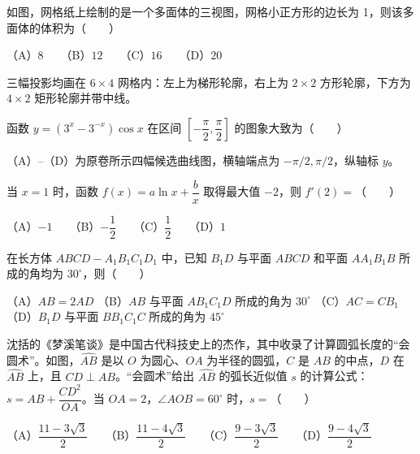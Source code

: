 \begin{question}
如图，网格纸上绘制的是一个多面体的三视图，网格小正方形的边长为 1，则该多面体的体积为\mbox{（　　）}

（A）$8$　　（B）$12$　　（C）$16$　　（D）$20$

三幅投影均画在 $6\times4$ 网格内：左上为梯形轮廓，右上为 $2\times2$ 方形轮廓，下方为 $4\times2$ 矩形轮廓并带中线。
\nopagebreak[4]
\begin{center}\end{center}
\nopagebreak[4]
\Needspace{0.4\textheight}
\end{question}
\begin{question}
函数 $y=(3^x-3^{-x})\cos x$ 在区间 $\left[-\dfrac\pi2,\dfrac\pi2\right]$ 的图象大致为\mbox{（　　）}

（A）–（D）为原卷所示四幅候选曲线图，横轴端点为 $-\pi/2,\pi/2$，纵轴标 $y$。
\nopagebreak[4]
\begin{center}\end{center}
\nopagebreak[4]
\end{question}
\begin{question}
当 $x=1$ 时，函数 $f(x)=a\ln x+\dfrac bx$ 取得最大值 $-2$，则 $f'(2)=$\mbox{（　　）}

（A）$-1$　　（B）$-\dfrac12$　　（C）$\dfrac12$　　（D）$1$

\end{question}
\begin{question}
在长方体 $ABCD-A_1B_1C_1D_1$ 中，已知 $B_1D$ 与平面 $ABCD$ 和平面 $AA_1B_1B$ 所成的角均为 $30^\circ$，则\mbox{（　　）}

（A）$AB=2AD$  
（B）$AB$ 与平面 $AB_1C_1D$ 所成的角为 $30^\circ$  
（C）$AC=CB_1$  
（D）$B_1D$ 与平面 $BB_1C_1C$ 所成的角为 $45^\circ$

\Needspace{0.4\textheight}
\end{question}
\begin{question}
沈括的《梦溪笔谈》是中国古代科技史上的杰作，其中收录了计算圆弧长度的“会圆术”。如图，$\widehat{AB}$ 是以 $O$ 为圆心、$OA$ 为半径的圆弧，$C$ 是 $AB$ 的中点，$D$ 在 $\widehat{AB}$ 上，且 $CD\perp AB$。“会圆术”给出 $\widehat{AB}$ 的弧长近似值 $s$ 的计算公式：$s=AB+\dfrac{CD^2}{OA}$。当 $OA=2$，$\angle AOB=60^\circ$ 时，$s=$\mbox{（　　）}

（A）$\dfrac{11-3\sqrt3}{2}$　　（B）$\dfrac{11-4\sqrt3}{2}$　　（C）$\dfrac{9-3\sqrt3}{2}$　　（D）$\dfrac{9-4\sqrt3}{2}$
\nopagebreak[4]
\begin{center}\end{center}
\nopagebreak[4]
\end{question}

